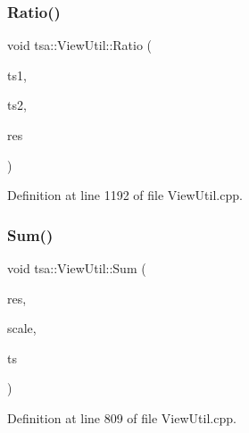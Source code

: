 \subsubsection{\texorpdfstring{Ratio()}{Ratio()}\hspace{0.1cm}{\footnotesize\ttfamily [4/4]}}
{\footnotesize\ttfamily void tsa\+::\+View\+Util\+::\+Ratio (\begin{DoxyParamCaption}\item[{\hyperlink{namespacetsa_ab32775c889b53c40fa83939f22372b75}{Seq\+View\+Complex} \&}]{ts1,  }\item[{\hyperlink{namespacetsa_ac599574bcc094eda25613724b8f3ca9e}{Seq\+View\+Double} \&}]{ts2,  }\item[{\hyperlink{namespacetsa_ab32775c889b53c40fa83939f22372b75}{Seq\+View\+Complex} \&}]{res }\end{DoxyParamCaption})\hspace{0.3cm}{\ttfamily [static]}}



Definition at line 1192 of file View\+Util.\+cpp.

\mbox{\label{classtsa_1_1_view_util_a9e41750dd9f5f087db64175b4a50f87d}} 
\subsubsection{\texorpdfstring{Sum()}{Sum()}\hspace{0.1cm}{\footnotesize\ttfamily [1/2]}}
{\footnotesize\ttfamily void tsa\+::\+View\+Util\+::\+Sum (\begin{DoxyParamCaption}\item[{\hyperlink{namespacetsa_ac599574bcc094eda25613724b8f3ca9e}{Seq\+View\+Double} \&}]{res,  }\item[{double}]{scale,  }\item[{\hyperlink{namespacetsa_ac599574bcc094eda25613724b8f3ca9e}{Seq\+View\+Double} \&}]{ts }\end{DoxyParamCaption})\hspace{0.3cm}{\ttfamily [static]}}



Definition at line 809 of file View\+Util.\+cpp.

\mbox{\label{classtsa_1_1_view_util_a9647a25c2db49cdd25b864f4465491f1}} 
